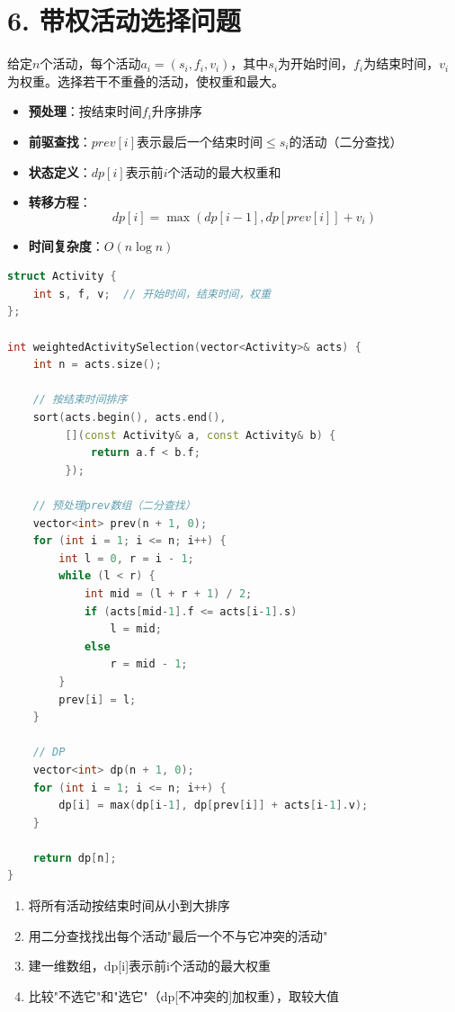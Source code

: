 \section*{6. 带权活动选择问题}

给定$n$个活动，每个活动$a_i = (s_i, f_i, v_i)$，其中$s_i$为开始时间，$f_i$为结束时间，$v_i$为权重。选择若干不重叠的活动，使权重和最大。

\begin{itemize}
    \item \textbf{预处理}：按结束时间$f_i$升序排序
    \item \textbf{前驱查找}：$prev[i]$表示最后一个结束时间$\le s_i$的活动（二分查找）
    \item \textbf{状态定义}：$dp[i]$表示前$i$个活动的最大权重和
    \item \textbf{转移方程}：$$dp[i] = \max(dp[i-1], dp[prev[i]] + v_i)$$
    \item \textbf{时间复杂度}：$O(n \log n)$
\end{itemize}

\begin{lstlisting}[language=C++, style=cppstyle]
struct Activity {
    int s, f, v;  // 开始时间，结束时间，权重
};

int weightedActivitySelection(vector<Activity>& acts) {
    int n = acts.size();

    // 按结束时间排序
    sort(acts.begin(), acts.end(),
         [](const Activity& a, const Activity& b) {
             return a.f < b.f;
         });

    // 预处理prev数组（二分查找）
    vector<int> prev(n + 1, 0);
    for (int i = 1; i <= n; i++) {
        int l = 0, r = i - 1;
        while (l < r) {
            int mid = (l + r + 1) / 2;
            if (acts[mid-1].f <= acts[i-1].s)
                l = mid;
            else
                r = mid - 1;
        }
        prev[i] = l;
    }

    // DP
    vector<int> dp(n + 1, 0);
    for (int i = 1; i <= n; i++) {
        dp[i] = max(dp[i-1], dp[prev[i]] + acts[i-1].v);
    }

    return dp[n];
}
\end{lstlisting}

\begin{enumerate}
    \item 将所有活动按结束时间从小到大排序
    \item 用二分查找找出每个活动"最后一个不与它冲突的活动"
    \item 建一维数组，dp[i]表示前i个活动的最大权重
    \item 比较"不选它"和"选它"（dp[不冲突的]加权重），取较大值
\end{enumerate}
